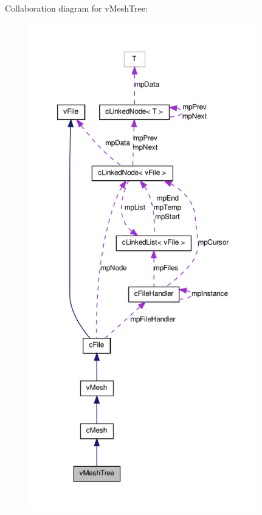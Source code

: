 Collaboration diagram for vMeshTree:
\nopagebreak
\begin{figure}[H]
\begin{center}
\leavevmode
\includegraphics[height=600pt]{classv_mesh_tree__coll__graph}
\end{center}
\end{figure}
